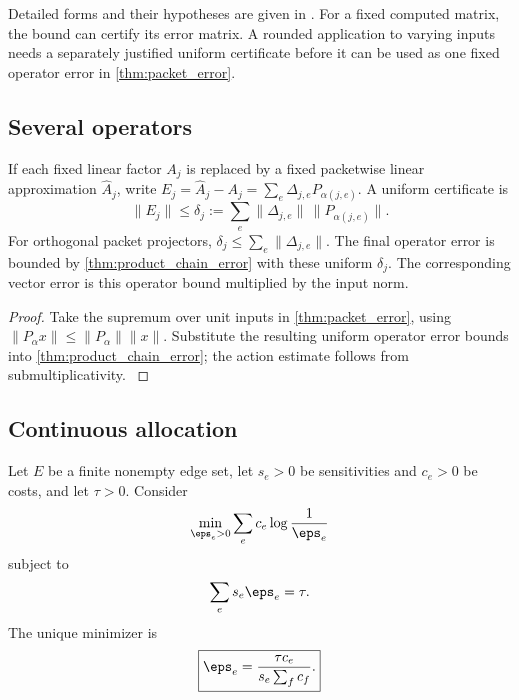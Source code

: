 Detailed forms and their hypotheses are given in \cite{Higham2002,HighamMary2021}. For a fixed computed matrix, the bound can certify its error matrix. A rounded application to varying inputs needs a separately justified uniform certificate before it can be used as one fixed operator error in \cref{thm:packet_error}.

\subsection{Several operators}\label{main:subsection:009}

\begin{corollary}\label{main:corollary:012}\label{cor:mixed_chain}
If each fixed linear factor $A_j$ is replaced by a fixed packetwise linear approximation $\widehat A_j$, write $E_j=\widehat A_j-A_j=\sum_e\Delta_{j,e}P_{\alpha(j,e)}$. A uniform certificate is
\[
\|E_j\|\le\delta_j:=\sum_e\|\Delta_{j,e}\|\,\|P_{\alpha(j,e)}\|.
\]
For orthogonal packet projectors, $\delta_j\le\sum_e\|\Delta_{j,e}\|$. The final operator error is bounded by \cref{thm:product_chain_error} with these uniform $\delta_j$. The corresponding vector error is this operator bound multiplied by the input norm.
\end{corollary}

\begin{proof}\label{main:proof:038}
Take the supremum over unit inputs in \cref{thm:packet_error}, using $\|P_{\alpha}x\|\le\|P_{\alpha}\|\|x\|$. Substitute the resulting uniform operator error bounds into \cref{thm:product_chain_error}; the action estimate follows from submultiplicativity.
\label{main:proof:038:end}\end{proof}

\subsection{Continuous allocation}\label{main:subsection:010}

\begin{theorem}\label{main:theorem:020}\label{thm:continuous_precision}
Let $E$ be a finite nonempty edge set, let $s_e>0$ be sensitivities and $c_e>0$ be costs, and let $\tau>0$. Consider
\[
\min_{\eps_e>0}
\sum_e c_e\log\frac1{\eps_e}
\]
subject to
\[
\sum_es_e\eps_e=\tau.
\]
The unique minimizer is
\[
\boxed{
\eps_e
=
\frac{\tau c_e}{s_e\sum_fc_f}.
}
\]
\end{theorem}

